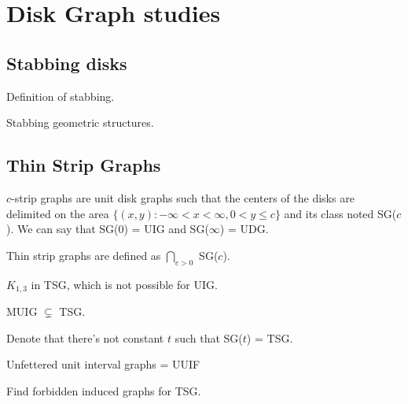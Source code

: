 \section{Disk Graph studies}

\subsection{Stabbing disks}

Definition of stabbing.

Stabbing geometric structures.\cite{schlipf2013stabbing}

\subsection{Thin Strip Graphs}

$c$-strip graphs are unit disk graphs such that the centers of the disks are delimited on the area $\{(x,y) : -\infty < x < \infty, 0 < y \leq c\}$ and its class noted SG($c$). We can say that SG(0) = UIG and SG($\infty$) = UDG. \cite{hayashiThinStripGraphs2017}

Thin strip graphs are defined as $\bigcap_{c > 0}$ SG($c$).

$K_{1,3}$ in TSG, which is not possible for UIG.

MUIG $\subsetneq$ TSG.

Denote that there's not constant $t$ such that SG($t$) = TSG.

Unfettered unit interval graphs = UUIF

\begin{defn}
  Find forbidden induced graphs for TSG.
\end{defn}

